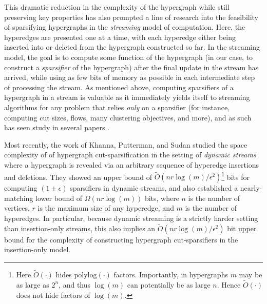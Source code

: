 \documentclass[11pt]{article}
\theoremstyle{definition}
\newcommand{\eps}{\epsilon}
\begin{document}
This dramatic reduction in the complexity of the hypergraph while still preserving key properties has also prompted a line of research into the feasibility of sparsifying hypergraphs in the \emph{streaming} model of computation. Here, the hyperedges are presented one at a time, with each hyperedge either being inserted into or deleted from the hypergraph constructed so far. In the streaming model, the goal is to compute some function of the hypergraph (in our case, to construct a \emph{sparsifier} of the hypergraph) after the final update in the stream has arrived, while using as few bits of memory as possible in each intermediate step of processing the stream. As mentioned above, computing sparsifiers of a hypergraph in a stream is valuable as it immediately yields itself to streaming algorithms for any problem that relies \emph{only} on a sparsifier (for instance, computing cut sizes, flows, many clustering objectives, and more), and as such has seen study in several papers \cite{GMT15, CKN20, KPS24d}. 

Most recently, the work of Khanna, Putterman, and Sudan \cite{KPS24d} studied the space complexity of of hypergraph cut-sparsification in the setting of {\em dynamic streams} where a hypergraph is revealed via an arbitrary sequence of hyperedge insertions and deletions. They showed an upper bound of $\widetilde{O}(nr \log(m) / \eps^2)$\footnote{Here $\widetilde{O}(\cdot)$ hides $\mathrm{polylog}(\cdot)$ factors. Importantly, in hypergraphs $m$ may be as large as $2^n$, and thus $\log(m)$ can potentially be as large $n$. Hence $\widetilde{O}(\cdot)$ does not hide factors of $\log(m)$.} bits for computing $(1 \pm \eps)$ sparsifiers in dynamic streams, and also established a nearly-matching lower bound of $\Omega(nr \log(m))$ bits, where $n$ is the number of vertices, $r$ is the maximum size of any hyperedge, and $m$ is the number of hyperedges. In particular, because dynamic streaming is a strictly harder setting than insertion-only streams, this also implies an $\widetilde{O}(nr \log(m) / \eps^2)$ bit upper bound for the complexity of constructing hypergraph cut-sparsifiers in the insertion-only model. 
\end{document}
